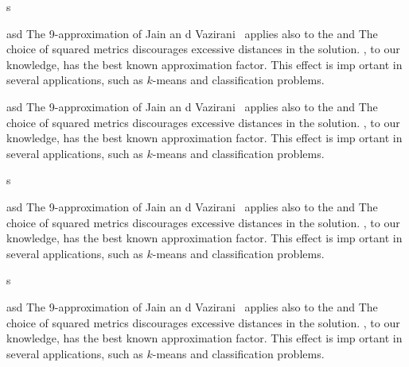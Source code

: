 s

            \item asd The 9-approximation of Jain an d Vazirani~\cite{JainV01}
              applies also to the \smflp and The choice of squared metrics
              discourages excessive distances in the solution. , to our
              knowledge, has the best known approximation factor. This effect is
              imp ortant in several applications, such as $k$-means and
              classification problems.
            \item asd The 9-approximation of Jain an d Vazirani~\cite{JainV01}
              applies also to the \smflp and The choice of squared metrics
              discourages excessive distances in the solution. , to our
              knowledge, has the best known approximation factor. This effect is
              imp ortant in several applications, such as $k$-means and
              classification problems.

s

\item asd The 9-approximation of Jain an d Vazirani~\cite{JainV01} applies also
  to the \smflp and The choice of squared metrics discourages excessive
  distances in the solution. , to our knowledge, has the best known
  approximation factor. This effect is imp ortant in several applications, such
  as $k$-means and classification problems.

s

\item asd The 9-approximation of Jain an d Vazirani~\cite{JainV01} applies also
  to the \smflp and The choice of squared metrics discourages excessive
  distances in the solution. , to our knowledge, has the best known
  approximation factor. This effect is imp ortant in several applications, such
  as $k$-means and classification problems.
